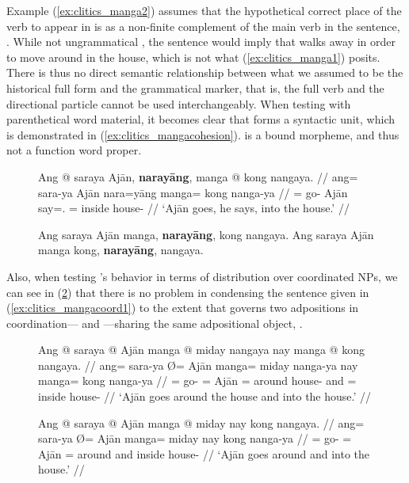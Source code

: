 Example (\ref{ex:clitics_manga2}) assumes that the hypothetical correct place
of the verb  to appear in is as a non-finite complement
of the main verb in the sentence, . While not
ungrammatical , the sentence would imply that 
walks away in order to move around in the house, which is not what
(\ref{ex:clitics_manga1}) posits. There is thus no direct semantic relationship
between what we assumed to be the historical full form and the grammatical
marker, that is, the full verb and the directional particle cannot be used
interchangeably. When testing with parenthetical word material, it becomes
clear that  forms a syntactic unit, which is
demonstrated in (\ref{ex:clitics_mangacohesion}).  is a bound
morpheme, and thus not a function word proper.

\begin{figure}
\pex\label{ex:clitics_mangacohesion}
\a\label{ex:clitics_mangacohesion1}\begingl
	\gla Ang @ saraya Ajān, \textbf{narayāng}, manga @ kong nangaya. //
	\glb ang= sara-ya Ajān nara=yāng manga= kong nanga-ya //
	\glc \AgtT{}= go-\TsgM{} Ajān say=\TsgM{}.\Aarg{} \Dir{}= inside 
		house-\Loc{} //
	\glft `Ajān goes, he says, into the house.' //
\endgl

\a\label{ex:clitics_mangacohesion2}
	\ljudge{*} Ang saraya Ajān manga, \textbf{narayāng}, kong nangaya.
\a\label{ex:clitics_mangacohesion3}
	Ang saraya Ajān manga kong, \textbf{narayāng}, nangaya.
\xe
\end{figure}

Also, when testing 's behavior in terms of distribution over
coordinated NPs, we can see in (\ref{ex:clitics_mangacoord2}) that there is no
problem in condensing the sentence given in (\ref{ex:clitics_mangacoord1}) to
the extent that  governs two adpositions in
coordination--- and
---sharing the same adpositional object,
.

\begin{figure}
\pex\label{ex:clitics_mangacoord}
\a\label{ex:clitics_mangacoord1}\begingl
	\gla Ang @ saraya {} @ Ajān manga @ miday nangaya nay manga @ kong 
		nangaya. //
	\glb ang= sara-ya Ø= Ajān manga= miday nanga-ya nay manga= kong nanga-ya //
	\glc \AgtT{}= go-\TsgM{} \Top{}= Ajān \Dir{}= around house-\Loc{} and
		\Dir{}= inside house-\Loc{} //
	\glft `Ajān goes around the house and into the house.' //
\endgl

\a\label{ex:clitics_mangacoord2}\begingl
	\gla Ang @ saraya {} @ Ajān manga @ miday nay kong nangaya. //
	\glb ang= sara-ya Ø= Ajān manga= miday nay kong nanga-ya //
	\glc \AgtT{}= go-\TsgM{} \Top{}= Ajān \Dir{}= around and inside
		house-\Loc{} //
	\glft `Ajān goes around and into the house.' //
\endgl
\xe
\end{figure}

